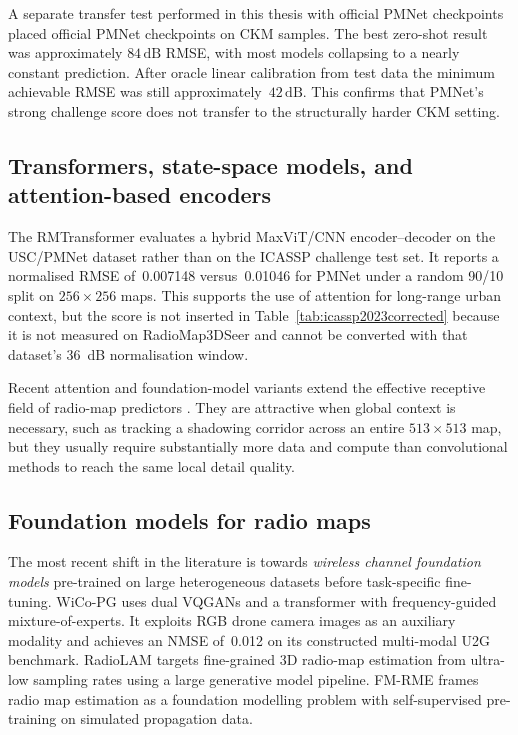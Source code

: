 A separate transfer test performed in this thesis with official PMNet checkpoints
placed official PMNet checkpoints on CKM samples.  The best zero-shot result was
approximately $84\,\mathrm{dB}$ RMSE, with most models collapsing to a nearly
constant prediction.  After oracle linear calibration from test data the minimum
achievable RMSE was still approximately~$42\,\mathrm{dB}$.  This confirms that
PMNet's strong challenge score does not transfer to the structurally harder CKM
setting.

\subsection{Transformers, state-space models, and attention-based encoders}

The RMTransformer \cite{rmtransformer2025} evaluates a hybrid MaxViT/CNN
encoder--decoder on the USC/PMNet dataset rather than on the ICASSP challenge
test set.  It reports a normalised RMSE of~0.007148 versus~0.01046 for PMNet
under a random 90/10 split on \(256\times256\) maps.  This supports the use of
attention for long-range urban context, but the score is not inserted in
Table~\ref{tab:icassp2023corrected} because it is not measured on
RadioMap3DSeer and cannot be converted with that dataset's \SI{36}{dB}
normalisation window.

Recent attention and foundation-model variants extend the effective receptive
field of radio-map predictors \cite{wicopg2025,fmrme2026}.  They are attractive
when global context is necessary, such as tracking a shadowing corridor across
an entire $513 \times 513$ map, but they usually require substantially more data
and compute than convolutional methods to reach the same local detail quality.

\subsection{Foundation models for radio maps}

The most recent shift in the literature is towards \emph{wireless channel
foundation models} pre-trained on large heterogeneous datasets before
task-specific fine-tuning.  WiCo-PG \cite{wicopg2025} uses dual VQGANs and a
transformer with frequency-guided mixture-of-experts.  It exploits RGB drone
camera images as an auxiliary modality and achieves an NMSE of~0.012 on its
constructed multi-modal U2G benchmark.  RadioLAM \cite{radiolam2025} targets
fine-grained 3D radio-map estimation from ultra-low sampling rates using a
large generative model pipeline.  FM-RME \cite{fmrme2026} frames radio map estimation as a foundation
modelling problem with self-supervised pre-training on simulated propagation
data.

